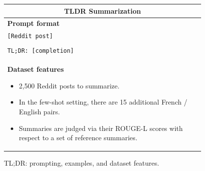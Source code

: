 \begin{figure}[p]
    \centering \small
    \begin{tabular}{p{0.95\linewidth}}
    \toprule
    \multicolumn{1}{c}{\textbf{TLDR Summarization}} \\

    \midrule
    \textbf{Prompt format}  \\
    \texttt{[Reddit post]} \\\\
    \texttt{TL;DR: [completion]} \\

    \midrule
    \textbf{Dataset features}
    \begin{itemize}
        \item 2,500 Reddit posts to summarize.
        \item In the few-shot setting, there are 15 additional French / English pairs.
        \item Summaries are judged via their ROUGE-L scores with respect to a set of reference summaries.
    \end{itemize} \\

    \bottomrule
    \end{tabular}
    \caption{TL;DR: prompting, examples, and dataset features.}
    \label{tab:prompt-tldr}
\end{figure}




\newlength{\savedtabcolsep}
\setlength{\savedtabcolsep}{\tabcolsep}
\setlength{\tabcolsep}{4pt}

